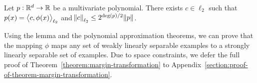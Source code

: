 \begin{lemma}
\label{lemma:norm-bound}
Let $p:\mathbb{R}^d \to \mathbb{R}$ be a multivariate polynomial.
There exists $c \in \ell_2$ such that $p(x) = \left\langle c, \phi(x) \right\rangle_{\ell_2}$
and $\norm{c}_{\ell_2} \le 2^{\deg(p)/2} \norm{p}$.
\end{lemma}

Using the lemma and the polynomial approximation theorems, we can prove that the
mapping $\phi$ maps any set of weakly linearly separable examples to a strongly
linearly separable set of examples. Due to space constraints, we defer the full
proof of Theorem~\ref{theorem:margin-transformation} to
Appendix~\ref{section:proof-of-theorem-margin-transformation}.




